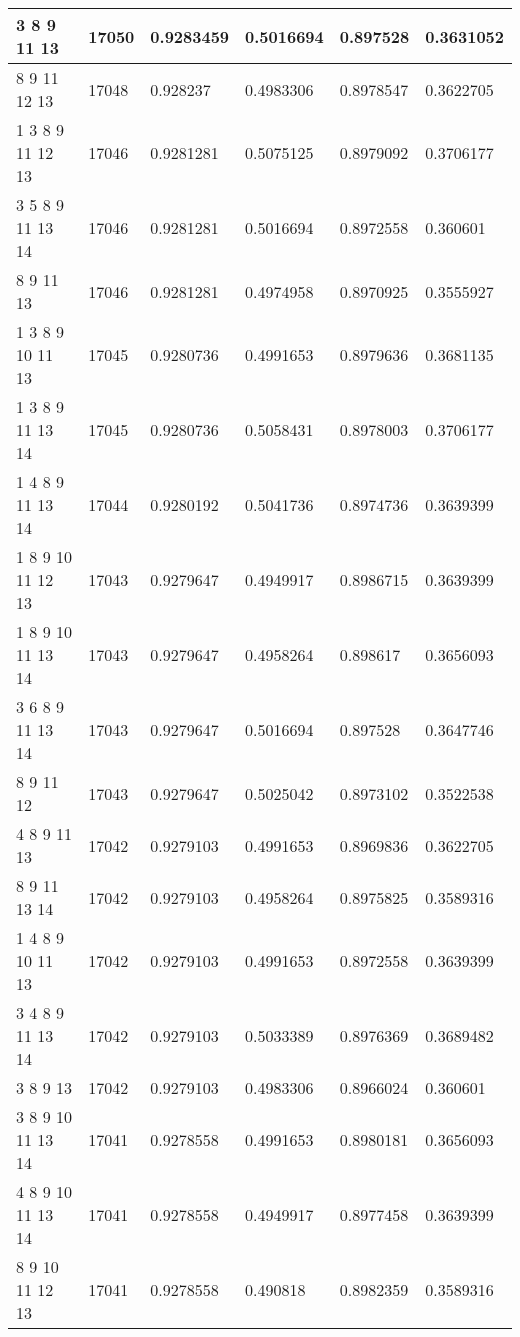 \begin{table}[!htb] 
 \centering
 \begin{tabular}{|l|l|l|l|l|l|}
\hline 
3 8 9 11 13 &	17050 &	0.9283459 &	0.5016694 &	0.897528 &	0.3631052\\ 
\hline 
8 9 11 12 13 &	17048 &	0.928237 &	0.4983306 &	0.8978547 &	0.3622705\\ 
\hline 
1 3 8 9 11 12 13 &	17046 &	0.9281281 &	0.5075125 &	0.8979092 &	0.3706177\\ 
\hline 
3 5 8 9 11 13 14 &	17046 &	0.9281281 &	0.5016694 &	0.8972558 &	0.360601\\ 
\hline 
8 9 11 13 &	17046 &	0.9281281 &	0.4974958 &	0.8970925 &	0.3555927\\ 
\hline 
1 3 8 9 10 11 13 &	17045 &	0.9280736 &	0.4991653 &	0.8979636 &	0.3681135\\ 
\hline 
1 3 8 9 11 13 14 &	17045 &	0.9280736 &	0.5058431 &	0.8978003 &	0.3706177\\ 
\hline 
1 4 8 9 11 13 14 &	17044 &	0.9280192 &	0.5041736 &	0.8974736 &	0.3639399\\ 
\hline 
1 8 9 10 11 12 13 &	17043 &	0.9279647 &	0.4949917 &	0.8986715 &	0.3639399\\ 
\hline 
1 8 9 10 11 13 14 &	17043 &	0.9279647 &	0.4958264 &	0.898617 &	0.3656093\\ 
\hline 
3 6 8 9 11 13 14 &	17043 &	0.9279647 &	0.5016694 &	0.897528 &	0.3647746\\ 
\hline 
8 9 11 12 &	17043 &	0.9279647 &	0.5025042 &	0.8973102 &	0.3522538\\ 
\hline 
4 8 9 11 13 &	17042 &	0.9279103 &	0.4991653 &	0.8969836 &	0.3622705\\ 
\hline 
8 9 11 13 14 &	17042 &	0.9279103 &	0.4958264 &	0.8975825 &	0.3589316\\ 
\hline 
1 4 8 9 10 11 13 &	17042 &	0.9279103 &	0.4991653 &	0.8972558 &	0.3639399\\ 
\hline 
3 4 8 9 11 13 14 &	17042 &	0.9279103 &	0.5033389 &	0.8976369 &	0.3689482\\ 
\hline 
3 8 9 13 &	17042 &	0.9279103 &	0.4983306 &	0.8966024 &	0.360601\\ 
\hline 
3 8 9 10 11 13 14 &	17041 &	0.9278558 &	0.4991653 &	0.8980181 &	0.3656093\\ 
\hline 
4 8 9 10 11 13 14 &	17041 &	0.9278558 &	0.4949917 &	0.8977458 &	0.3639399\\ 
\hline 
8 9 10 11 12 13 &	17041 &	0.9278558 &	0.490818 &	0.8982359 &	0.3589316\\ 
\hline 
 \end{tabular}
 \label{tab:lab_mult_eql} 
\end{table}